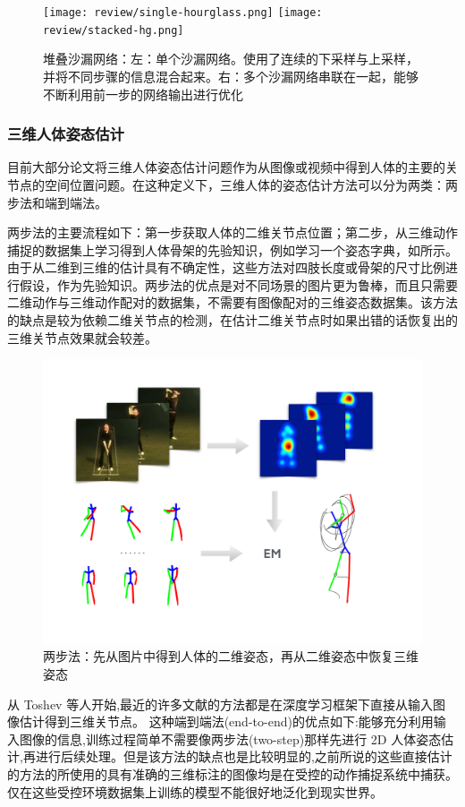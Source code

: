\begin{figure}[ht]
    \texttt{[image: review/single-hourglass.png]}
    \texttt{[image: review/stacked-hg.png]}
    \caption{堆叠沙漏网络\cite{newell2016stacked}：左：单个沙漏网络。使用了连续的下采样与上采样，并将不同步骤的信息混合起来。右：多个沙漏网络串联在一起，能够不断利用前一步的网络输出进行优化}\label{fig:hourglass}
\end{figure}


\subsubsection{三维人体姿态估计}
目前大部分论文将三维人体姿态估计问题作为从图像或视频中得到人体的主要的关节点的空间位置问题。在这种定义下，三维人体的姿态估计方法可以分为两类：两步法和端到端法。

两步法的主要流程如下：第一步获取人体的二维关节点位置；第二步，从三维动作捕捉的数据集上学习得到人体骨架的先验知识，例如学习一个姿态字典\cite{zhou2015sparse}，如所示。由于从二维到三维的估计具有不确定性，这些方法对四肢长度或骨架的尺寸比例进行假设，作为先验知识。两步法的优点是对不同场景的图片更为鲁棒，而且只需要二维动作与三维动作配对的数据集，不需要有图像配对的三维姿态数据集。该方法的缺点是较为依赖二维关节点的检测，在估计二维关节点时如果出错的话恢复出的三维关节点效果就会较差。

\begin{figure}[ht]
    \centering
    \includegraphics[width=0.4\linewidth]{figures/overview.pdf}
    \caption{两步法\cite{zhou2015sparse}：先从图片中得到人体的二维姿态，再从二维姿态中恢复三维姿态}\label{fig:twostep}
\end{figure}

从 Toshev \cite{toshev2014deep}等人开始,最近的许多文献的方法都是在深度学习框架下直接从输入图像估计得到三维关节点\cite{pavlakos2017coarse,zhou2017weaklysupervised}。%
这种端到端法(end-to-end)的优点如下:能够充分利用输入图像的信息,训练过程简单不需要像两步法(two-step)那样先进行 2D 人体姿态估计,再进行后续处理。但是该方法的缺点也是比较明显的,之前所说的这些直接估计的方法的所使用的具有准确的三维标注的图像均是在受控的动作捕捉系统中捕获。仅在这些受控环境数据集上训练的模型不能很好地泛化到现实世界。

